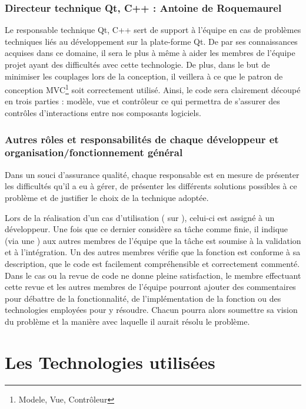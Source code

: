 \subsubsection{Directeur technique Qt, C++ : Antoine de Roquemaurel}
Le responsable technique Qt, C++ sert de support à l'équipe en cas de problèmes techniques liés au développement sur la plate-forme Qt. De par ses
connaissances acquises dans ce domaine, il sera le plus à même à aider les membres de l'équipe projet ayant des difficultés avec cette technologie.
De plus, dans le but de minimiser les couplages lors de la conception, il veillera à ce que le patron de conception MVC\footnote{Modele, Vue, Contrôleur} soit correctement utilisé. Ainsi, le code
sera clairement découpé en trois parties : modèle, vue et contrôleur ce qui permettra de s’assurer des contrôles d'interactions entre nos composants
logiciels.

\subsubsection{Autres rôles et responsabilités de chaque développeur et organisation/fonctionnement général}
Dans un souci d’assurance qualité, chaque responsable est en mesure de présenter les difficultés qu'il a eu à gérer, de présenter les différents
solutions possibles à ce problème et de justifier le choix de la technique adoptée.

Lors de la réalisation d’un cas d’utilisation ( sur ), celui-ci est assigné à un développeur. Une fois que ce dernier considère sa
tâche comme finie, il indique (via une ) aux autres membres de l’équipe que la tâche est soumise à la validation et à l'intégration.
Un des autres membres vérifie que la fonction est conforme à sa description, que le code est facilement compréhensible et correctement commenté. Dans
le cas ou la revue de code ne donne pleine satisfaction, le membre effectuant cette revue et les autres membres de l’équipe pourront ajouter des
commentaires pour débattre de la fonctionnalité, de l’implémentation de la fonction ou des technologies employées pour y résoudre. Chacun pourra
alors soumettre sa vision du problème et la manière avec laquelle il aurait résolu le problème. 

\section{Les Technologies utilisées}
